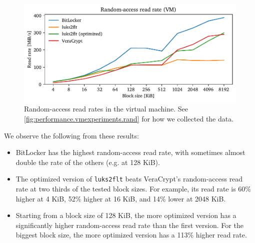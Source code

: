 \begin{figure}[htb!]
	\center
	\includegraphics[scale=1]{../fig/performance.vmexperiments.rand.pdf}
	\caption[
		Random-access read rates in the virtual machine
	]{
		Random-access read rates in the virtual machine. See \autoref{fig:performance.vmexperiments.rand} for how we collected the data.
	}
	\label{fig:performance.vmexperiments.rand}
\end{figure}

We observe the following from these results:
\begin{itemize}
	\item BitLocker has the highest random-access read rate, with sometimes almost double the rate of the others (e.g. at 128 KiB).
	\item The optimized version of \texttt{luks2flt} beats VeraCrypt's random-access read rate at two thirds of the tested block sizes. For example, its read rate is 60\% higher at 4 KiB, 52\% higher at 16 KiB, and 14\% lower at 2048 KiB.
	\item Starting from a block size of 128 KiB, the more optimized version has a significantly higher random-access read rate than the first version. For the biggest block size, the more optimized version has a 113\% higher read rate.
\end{itemize}

